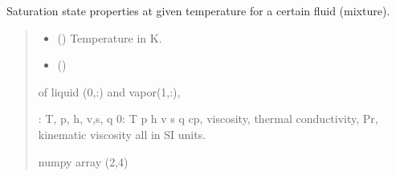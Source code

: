 \documentclass[letterpaper,10pt,english]{sphinxmanual}
\begin{document}
\begin{fulllineitems}
\label{\detokenize{fluid_properties_rp:fluid_properties_rp.T_prop_sat}}
\pysigstartsignatures
{}
\pysigstopsignatures
\sphinxAtStartPar
Saturation state properties at given temperature for a certain fluid (mixture).
\begin{quote}\begin{description}
\begin{itemize}
\item {} 
\sphinxAtStartPar
{} () \textendash{} Temperature in K.

\item {} 
\sphinxAtStartPar
{} () \textendash{} 

\end{itemize}

\sphinxAtStartPar

\sphinxAtStartPar
{} \textendash{}
\begin{description}
\sphinxAtStartPar
of liquid (0,:) and vapor(1,:),

\end{description}

: T, p, h, v,s, q
0:  T p h v s q cp, viscosity, thermal conductivity, Pr, kinematic viscosity
all in SI units.


\sphinxAtStartPar
numpy array (2,4)

\end{description}\end{quote}

\end{fulllineitems}
\end{document}
